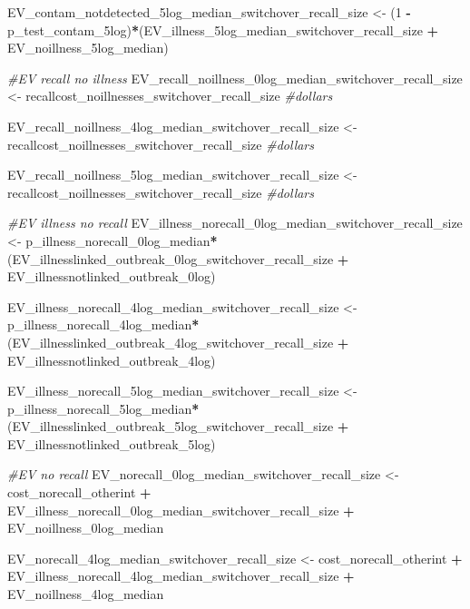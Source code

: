 \documentclass[
]{article}
\newenvironment{Shaded}{\begin{snugshade}}{\end{snugshade}}
\newcommand{\CommentTok}[1]{\textcolor[rgb]{0.56,0.35,0.01}{\textit{#1}}}
\newcommand{\DecValTok}[1]{\textcolor[rgb]{0.00,0.00,0.81}{#1}}
\newcommand{\NormalTok}[1]{#1}
\newcommand{\OtherTok}[1]{\textcolor[rgb]{0.56,0.35,0.01}{#1}}
\newcommand{\SpecialCharTok}[1]{\textcolor[rgb]{0.81,0.36,0.00}{\textbf{#1}}}
\begin{document}
\begin{Shaded}
\begin{Highlighting}[]
\NormalTok{EV\_contam\_notdetected\_5log\_median\_switchover\_recall\_size }\OtherTok{\textless{}{-}}\NormalTok{ (}\DecValTok{1} \SpecialCharTok{{-}}\NormalTok{ p\_test\_contam\_5log)}\SpecialCharTok{*}\NormalTok{(EV\_illness\_5log\_median\_switchover\_recall\_size }\SpecialCharTok{+}\NormalTok{ EV\_noillness\_5log\_median)}


\CommentTok{\#EV recall no illness}
\NormalTok{EV\_recall\_noillness\_0log\_median\_switchover\_recall\_size }\OtherTok{\textless{}{-}}\NormalTok{ recallcost\_noillnesses\_switchover\_recall\_size }\CommentTok{\#dollars}

\NormalTok{EV\_recall\_noillness\_4log\_median\_switchover\_recall\_size }\OtherTok{\textless{}{-}}\NormalTok{ recallcost\_noillnesses\_switchover\_recall\_size }\CommentTok{\#dollars}

\NormalTok{EV\_recall\_noillness\_5log\_median\_switchover\_recall\_size }\OtherTok{\textless{}{-}}\NormalTok{ recallcost\_noillnesses\_switchover\_recall\_size }\CommentTok{\#dollars}


\CommentTok{\#EV illness no recall}
\NormalTok{EV\_illness\_norecall\_0log\_median\_switchover\_recall\_size }\OtherTok{\textless{}{-}}\NormalTok{ p\_illness\_norecall\_0log\_median}\SpecialCharTok{*}\NormalTok{(EV\_illnesslinked\_outbreak\_0log\_switchover\_recall\_size }\SpecialCharTok{+}\NormalTok{ EV\_illnessnotlinked\_outbreak\_0log)}

\NormalTok{EV\_illness\_norecall\_4log\_median\_switchover\_recall\_size }\OtherTok{\textless{}{-}}\NormalTok{ p\_illness\_norecall\_4log\_median}\SpecialCharTok{*}\NormalTok{(EV\_illnesslinked\_outbreak\_4log\_switchover\_recall\_size }\SpecialCharTok{+}\NormalTok{ EV\_illnessnotlinked\_outbreak\_4log)}

\NormalTok{EV\_illness\_norecall\_5log\_median\_switchover\_recall\_size }\OtherTok{\textless{}{-}}\NormalTok{ p\_illness\_norecall\_5log\_median}\SpecialCharTok{*}\NormalTok{(EV\_illnesslinked\_outbreak\_5log\_switchover\_recall\_size }\SpecialCharTok{+}\NormalTok{ EV\_illnessnotlinked\_outbreak\_5log)}


\CommentTok{\#EV no recall}
\NormalTok{EV\_norecall\_0log\_median\_switchover\_recall\_size  }\OtherTok{\textless{}{-}}\NormalTok{ cost\_norecall\_otherint }\SpecialCharTok{+}\NormalTok{ EV\_illness\_norecall\_0log\_median\_switchover\_recall\_size  }\SpecialCharTok{+}\NormalTok{ EV\_noillness\_0log\_median}

\NormalTok{EV\_norecall\_4log\_median\_switchover\_recall\_size  }\OtherTok{\textless{}{-}}\NormalTok{ cost\_norecall\_otherint }\SpecialCharTok{+}\NormalTok{ EV\_illness\_norecall\_4log\_median\_switchover\_recall\_size  }\SpecialCharTok{+}\NormalTok{ EV\_noillness\_4log\_median}


\end{Highlighting}
\end{Shaded}
\end{document}

